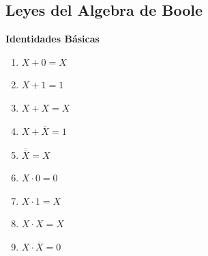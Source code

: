 \documentclass{templateNote}
\begin{document}
\subsection{Leyes del Algebra de Boole}
\textbf{Identidades Básicas} \\
\noindent %
\begin{minipage}[t]{0.5\textwidth}
    \begin{enumerate}
        \item $X + 0 = X$
        \item $X + 1 = 1$
        \item $X + X = X$
        \item $X + \overline{X} = 1$
        \item $\overline{\overline{X}} = X$
    \end{enumerate}
\end{minipage}%
\begin{minipage}[t]{0.5\textwidth}
    \begin{enumerate}
        \setcounter{enumi}{5} %
        \item $X \cdot 0 = 0$
        \item $X \cdot 1 = X$
        \item $X \cdot X = X$
        \item $X \cdot \overline{X} = 0$
    \end{enumerate}
\end{minipage}
\vspace{0.5cm}
\end{document}
